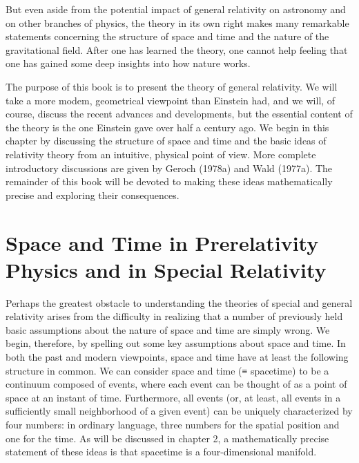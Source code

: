 But even aside from the potential impact of general relativity on astronomy and on other branches of physics, the theory in its own right makes many remarkable statements concerning the structure of space and time and the nature of the gravitational field. After one has learned the theory, one cannot help feeling that one has gained some deep insights into how nature works.

The purpose of this book is to present the theory of general relativity. We will take a more modem, geometrical viewpoint than Einstein had, and we will, of course, discuss the recent advances and developments, but the essential content of the theory is the one Einstein gave over half a century ago. We begin in this chapter by discussing the structure of space and time and the basic ideas of relativity theory from an intuitive, physical point of view. More complete introductory discussions are given by Geroch (1978a) and Wald (1977a). The remainder of this book will be devoted to making these ideas mathematically precise and exploring their consequences.

\section{Space and Time in Prerelativity Physics and in Special Relativity}

Perhaps the greatest obstacle to understanding the theories of special and general relativity arises from the difficulty in realizing that a number of previously held basic assumptions about the nature of space and time are simply wrong. We begin, therefore, by spelling out some key assumptions about space and time. In both the past and modern viewpoints, space and time have at least the following structure in common. We can consider space and time (≡ spacetime) to be a continuum composed of events, where each event can be thought of as a point of space at an instant of time. Furthermore, all events (or, at least, all events in a sufficiently small neighborhood of a given event) can be uniquely characterized by four numbers: in ordinary language, three numbers for the spatial position and one for the time. As will be discussed in chapter 2, a mathematically precise statement of these ideas is that spacetime is a four-dimensional manifold.


